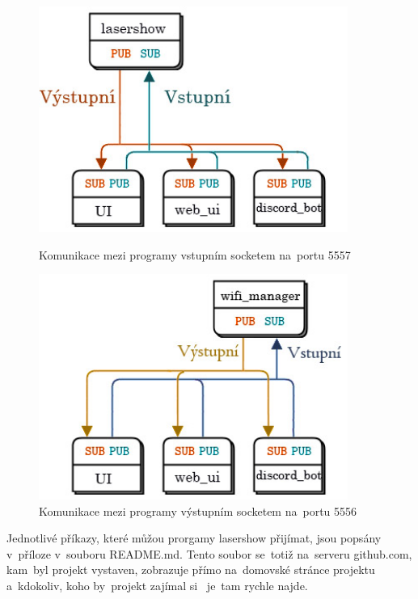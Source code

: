 \begin{figure}[htb]
  \centering
  \begin{minipage}{0.45\textwidth}
    \centering
    \includegraphics[width=0.9\textwidth]{img/comms_lasershow_scheme.jpg}
    \caption{\label{fig:lasershow_comms} Komunikace mezi programy vstupním socketem na~portu 5557}
  \end{minipage}\hfill
  \begin{minipage}{0.45\textwidth}
    \centering
    \includegraphics[width=0.9\textwidth]{img/comms_wifiman_scheme.jpg}
    \caption{\label{fig:wifiman_comms} Komunikace mezi programy výstupním socketem na~portu 5556}
  \end{minipage}
\end{figure}

Jednotlivé příkazy, které můžou prorgamy lasershow přijímat, jsou popsány v~příloze v~souboru README.md. Tento soubor se~totiž na~serveru github.com, kam~byl projekt vystaven, zobrazuje přímo na~domovské stránce projektu a~kdokoliv, koho by~projekt zajímal si ~je~tam rychle najde.
